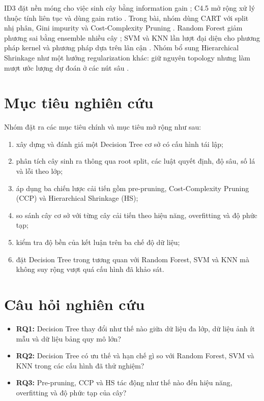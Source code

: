ID3 đặt nền móng cho việc sinh cây bằng information gain \cite{quinlan1986id3}; C4.5 mở rộng xử lý thuộc tính liên tục và dùng gain ratio \cite{quinlan1993c45}. Trong bài, nhóm dùng CART với split nhị phân, Gini impurity và Cost-Complexity Pruning \cite{breiman1984cart}. Random Forest giảm phương sai bằng ensemble nhiều cây \cite{breiman2001rf}; SVM và KNN lần lượt đại diện cho phương pháp kernel và phương pháp dựa trên lân cận \cite{cortes1995svm,cover1967knn}. Nhóm bổ sung Hierarchical Shrinkage như một hướng regularization khác: giữ nguyên topology nhưng làm mượt ước lượng dự đoán ở các nút sâu \cite{agarwal2022hs}.

\section{Mục tiêu nghiên cứu}

Nhóm đặt ra các mục tiêu chính và mục tiêu mở rộng như sau:

\begin{enumerate}
    \item xây dựng và đánh giá một Decision Tree cơ sở có cấu hình tái lập;
    \item phân tích cây sinh ra thông qua root split, các luật quyết định, độ sâu, số lá và lỗi theo lớp;
    \item áp dụng ba chiến lược cải tiến gồm pre-pruning, Cost-Complexity Pruning (CCP) và Hierarchical Shrinkage (HS);
    \item so sánh cây cơ sở với từng cây cải tiến theo hiệu năng, overfitting và độ phức tạp;
    \item kiểm tra độ bền của kết luận trên ba chế độ dữ liệu;
    \item đặt Decision Tree trong tương quan với Random Forest, SVM và KNN mà không suy rộng vượt quá cấu hình đã khảo sát.
\end{enumerate}

\section{Câu hỏi nghiên cứu}

\begin{itemize}
    \item \textbf{RQ1:} Decision Tree thay đổi như thế nào giữa dữ liệu đa lớp, dữ liệu ảnh ít mẫu và dữ liệu bảng quy mô lớn?
    \item \textbf{RQ2:} Decision Tree có ưu thế và hạn chế gì so với Random Forest, SVM và KNN trong các cấu hình đã thử nghiệm?
    \item \textbf{RQ3:} Pre-pruning, CCP và HS tác động như thế nào đến hiệu năng, overfitting và độ phức tạp của cây?
\end{itemize}

